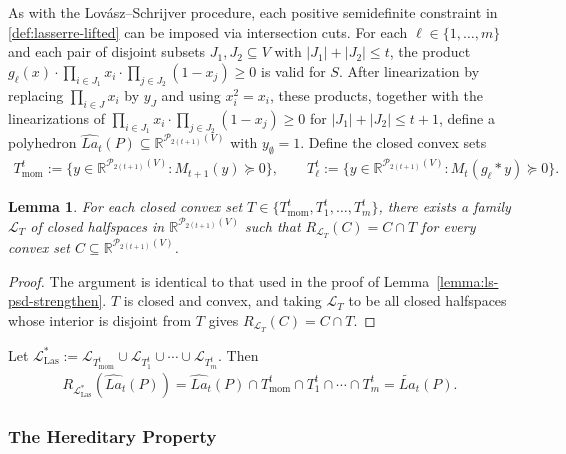 \documentclass{article}
\newtheorem{lemma}{Lemma}
\newcommand{\R}{\mathbb{R}}
\renewcommand{\P}{\mathcal{P}}
\renewcommand{\L}{\mathcal{L}}
\begin{document}
As with the Lov\'asz--Schrijver procedure, each positive semidefinite constraint in \eqref{def:lasserre-lifted} can be imposed via intersection cuts. For each $\ell \in \{1,\ldots,m\}$ and each pair of disjoint subsets $J_1, J_2 \subseteq V$ with $|J_1| + |J_2| \leq t$, the product $g_\ell(x) \cdot \prod_{i \in J_1} x_i \cdot \prod_{j \in J_2}(1-x_j) \geq 0$ is valid for $S$. After linearization by replacing $\prod_{i \in J} x_i$ by $y_J$ and using $x_i^2 = x_i$, these products, together with the linearizations of $\prod_{i \in J_1} x_i \cdot \prod_{j \in J_2}(1-x_j) \geq 0$ for $|J_1| + |J_2| \leq t+1$, define a polyhedron $\widehat{La}_t(P) \subseteq \R^{\P_{2(t+1)}(V)}$ with $y_\emptyset = 1$. Define the closed convex sets
\begin{align}
    T^t_{\mathrm{mom}} := \{y \in \R^{\P_{2(t+1)}(V)} : M_{t+1}(y) \succeq 0\}, \qquad T^t_\ell := \{y \in \R^{\P_{2(t+1)}(V)} : M_t(g_\ell * y) \succeq 0\}.
\end{align}

\begin{lemma} \label{lemma:lasserre-psd-strengthen}
    For each closed convex set $T \in \{T^t_{\mathrm{mom}}, T^t_1, \ldots, T^t_m\}$, there exists a family $\L_T$ of closed halfspaces in $\R^{\P_{2(t+1)}(V)}$ such that $R_{\L_T}(C) = C \cap T$ for every convex set $C \subseteq \R^{\P_{2(t+1)}(V)}$.
\end{lemma}

\begin{proof}
    The argument is identical to that used in the proof of Lemma~\ref{lemma:ls-psd-strengthen}. $T$ is closed and convex, and taking $\L_T$ to be all closed halfspaces whose interior is disjoint from $T$ gives $R_{\L_T}(C) = C \cap T$.
\end{proof}

Let $\L^*_{\mathrm{Las}} := \L_{T^t_{\mathrm{mom}}} \cup \L_{T^t_1} \cup \cdots \cup \L_{T^t_m}$. Then
\begin{align}
    R_{\L^*_{\mathrm{Las}}}(\widehat{La}_t(P)) = \widehat{La}_t(P) \cap T^t_{\mathrm{mom}} \cap T^t_1 \cap \cdots \cap T^t_m = \widetilde{La}_t(P). \label{eq:lasserre-as-L}
\end{align}

\subsubsection{The Hereditary Property} \label{subsec:lasserre-hered}
\end{document}
